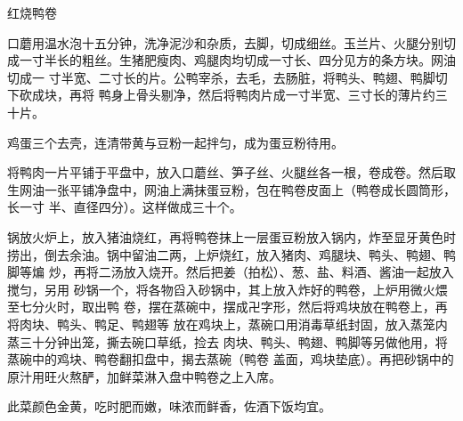\begin{recipe}{红烧鸭卷}

\ingredients


\preparation

\step 口蘑用温水泡十五分钟，洗净泥沙和杂质，去脚，切成细丝。玉兰片、火腿分别切
成一寸半长的粗丝。生猪肥瘦肉、鸡腿肉均切成一寸长、四分见方的条方块。网油切成一
寸半宽、二寸长的片。公鸭宰杀，去毛，去肠脏，将鸭头、鸭翅、鸭脚切下砍成块，再将
鸭身上骨头剔净，然后将鸭肉片成一寸半宽、三寸长的薄片约三十片。

\step 鸡蛋三个去壳，连清带黄与豆粉一起拌匀，成为蛋豆粉待用。

\step 将鸭肉一片平铺于平盘中，放入口蘑丝、笋子丝、火腿丝各一根，卷成卷。然后取
生网油一张平铺净盘中，网油上满抹蛋豆粉，包在鸭卷皮面上（鸭卷成长圆筒形，长一寸
半、直径四分）。这样做成三十个。

\step 锅放火炉上，放入猪油烧红，再将鸭卷抹上一层蛋豆粉放入锅内，炸至显牙黄色时
捞出，倒去余油。锅中留油二两，上炉烧红，放入猪肉、鸡腿块、鸭头、鸭翅、鸭脚等煸
炒，再将二汤放入烧开。然后把姜（拍松）、葱、盐、料酒、酱油一起放入搅匀，另用
砂锅一个，将各物舀入砂锅中，其上放入炸好的鸭卷，上炉用微火煨至七分火时，取出鸭
卷，摆在蒸碗中，摆成卍字形，然后将鸡块放在鸭卷上，再将肉块、鸭头、鸭足、鸭翅等
放在鸡块上，蒸碗口用消毒草纸封固，放入蒸笼内蒸三十分钟出笼，撕去碗口草纸，捡去
肉块、鸭头、鸭翅、鸭脚等另做他用，将蒸碗中的鸡块、鸭卷翻扣盘中，揭去蒸碗（鸭卷
盖面，鸡块垫底）。再把砂锅中的原汁用旺火熬酽，加鲜菜淋入盘中鸭卷之上入席。

\features

此菜颜色金黄，吃时肥而嫩，味浓而鲜香，佐酒下饭均宜。

\end{recipe}

